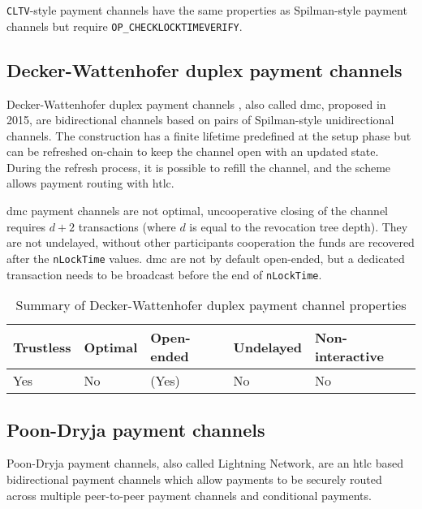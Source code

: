 \documentclass{llncs}
\begin{document}
\texttt{CLTV}-style payment channels have the same properties as Spilman-style payment channels but require \texttt{OP\_CHECKLOCKTIMEVERIFY}.

\subsection{Decker-Wattenhofer duplex payment channels}

Decker-Wattenhofer duplex payment channels \cite{Decker2015fast}, also called \gls{dmc}, proposed in 2015, are bidirectional channels based on pairs of Spilman-style unidirectional channels. The construction has a finite lifetime predefined at the setup phase but can be refreshed on-chain to keep the channel open with an updated state. During the refresh process, it is possible to refill the channel, and the scheme allows payment routing with \gls{htlc}.

\gls{dmc} payment channels are not optimal, uncooperative closing of the channel requires $d + 2$ transactions (where $d$ is equal to the revocation tree depth).  They are not undelayed, without other participants cooperation the funds are recovered after the \texttt{nLockTime} values. \gls{dmc} are not by default open-ended, but a dedicated transaction needs to be broadcast before the end of \texttt{nLockTime}.


\begin{table}[ht]
  \begin{tabularx}{\textwidth}{ | X | l | l | l | X |}
  \hline
  Trustless & Optimal & Open-ended & Undelayed & Non-interactive \\
  \hline \hline
  Yes & No & (Yes) & No & No \\
  \hline
  \end{tabularx}
  \caption{Summary of Decker-Wattenhofer duplex payment channel properties}
  \label{fig:summaryDeckerWattenhoferPaymentChannel}
\end{table}

\subsection{Poon-Dryja payment channels}

Poon-Dryja payment channels, also called Lightning Network, are an \gls{htlc} based bidirectional payment channels which allow payments to be securely routed across multiple peer-to-peer payment channels \cite{poon2016bitcoin} and conditional payments.
\end{document}
